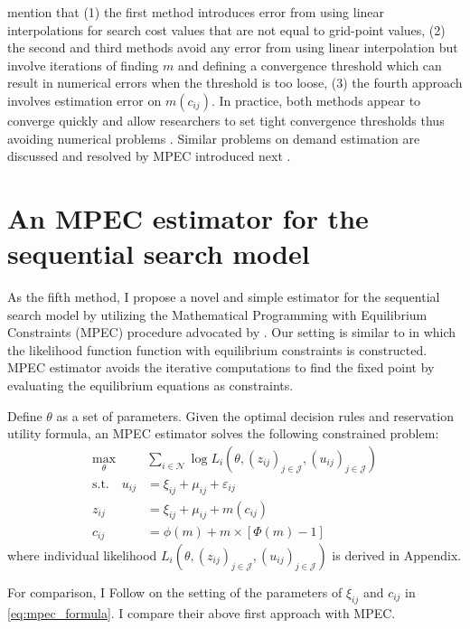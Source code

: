 \documentclass[12pt]{article}
\begin{document}
\cite{ursu2023sequential} mention that (1) the first method introduces error from using linear interpolations for search cost
values that are not equal to grid-point values, (2) the second and third methods avoid any error from using linear interpolation but involve iterations of finding $m$ and defining a convergence threshold which can result in numerical errors when the threshold is too loose, (3) the fourth approach involves estimation error on $m(c_{ij})$. 
In practice, both methods appear to converge quickly and allow researchers to set tight convergence thresholds thus avoiding numerical problems \citep{ursu2023sequential}. 
Similar problems on demand estimation are discussed and resolved by MPEC introduced next \citep{dube2012improving}. 



\section{An MPEC estimator for the sequential search model}
As the fifth method, I propose a novel and simple estimator for the sequential search model by utilizing
the Mathematical Programming with Equilibrium Constraints (MPEC) procedure advocated
by \cite{su2012constrained}. 
Our setting is similar to \cite{su2012constrained} in which the likelihood function
function with equilibrium constraints is constructed. 
MPEC estimator avoids the iterative computations to find the fixed point by evaluating the equilibrium equations as constraints.

Define $\theta$ as a set of parameters.
Given the optimal decision rules and reservation utility formula, an MPEC estimator solves the following constrained problem:
\begin{align}
    \max_{\theta}& \sum_{i\in \mathcal{N}} \log L_{i}(\theta,(z_{ij})_{j\in \mathcal{J}},(u_{ij})_{j\in \mathcal{J}})\nonumber\\
    \text{s.t.}\quad u_{i j} & =\xi_{i j}+\mu_{i j}+\varepsilon_{i j}\label{eq:mpec_formula}\\
    z_{i j}&=\xi_{i j}+\mu_{i j}+m\left(c_{i j}\right) \nonumber\\
    c_{i j}&=\phi(m)+m \times[\Phi(m)-1] \nonumber
\end{align}
where individual likelihood $L_{i}(\theta,(z_{ij})_{j\in \mathcal{J}},(u_{ij})_{j\in \mathcal{J}})$ is derived in Appendix.

For comparison, I Follow \cite{ursu2023sequential} on the setting of the parameters of $\xi_{ij}$ and $c_{ij}$ in \eqref{eq:mpec_formula}. I compare their above first approach with MPEC. 
\end{document}
